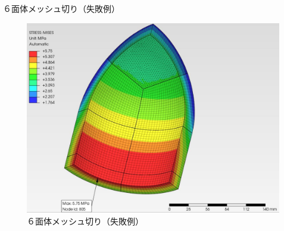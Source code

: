 \begin{frame}{６面体メッシュ切り（失敗例）}
 
\begin{figure}[htbp]
\begin{center}
\includegraphics[keepaspectratio,scale=1.0]{work/images/fig03.jpg}
\caption{６面体メッシュ切り（失敗例）}
\end{center}
\end{figure}
\end{frame}

